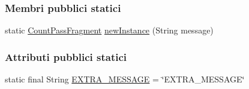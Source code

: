 \subsubsection*{Membri pubblici statici}
\begin{DoxyCompactItemize}
\item 
static \hyperlink{classit_1_1unibo_1_1torsello_1_1bluetoothpositioning_1_1fragment_1_1oldFragment_1_1CountPassFragment}{Count\+Pass\+Fragment} \hyperlink{classit_1_1unibo_1_1torsello_1_1bluetoothpositioning_1_1fragment_1_1oldFragment_1_1CountPassFragment_a0a03d5af96a619bfbc6e296447a325e9_a0a03d5af96a619bfbc6e296447a325e9}{new\+Instance} (String message)
\end{DoxyCompactItemize}
\subsubsection*{Attributi pubblici statici}
\begin{DoxyCompactItemize}
\item 
static final String \hyperlink{classit_1_1unibo_1_1torsello_1_1bluetoothpositioning_1_1fragment_1_1oldFragment_1_1CountPassFragment_a5729b3e7bd788b7d1b586938ced085d8_a5729b3e7bd788b7d1b586938ced085d8}{E\+X\+T\+R\+A\+\_\+\+M\+E\+S\+S\+A\+GE} = \char`\"{}E\+X\+T\+R\+A\+\_\+\+M\+E\+S\+S\+A\+GE\char`\"{}
\end{DoxyCompactItemize}
